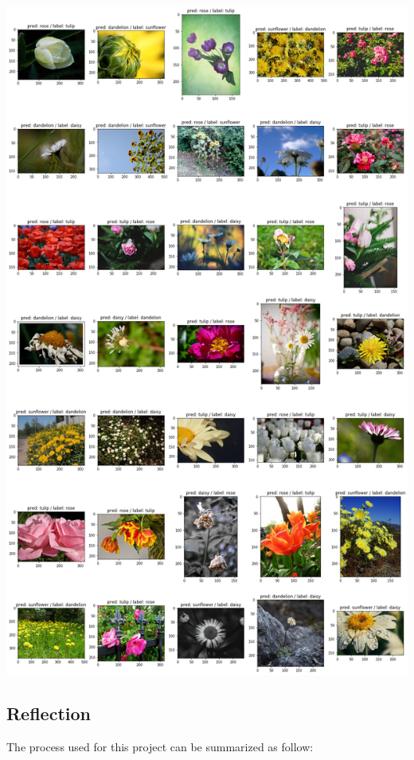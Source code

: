 \begin{center}
	\includegraphics[scale=.35]{sections/05_conclusion/output_43_0}
	\label{fig:output430}
\end{center}


\subsection{Reflection}

The process used for this project can be summarized as follow:

